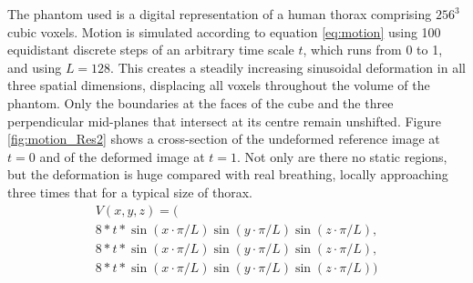 The phantom used is a digital representation\cite{xcatweb} of a human thorax comprising $256^3$ cubic voxels.  Motion is simulated according to equation \ref{eq:motion} using 100 equidistant discrete steps of an arbitrary time scale $t$, which runs from 0 to 1, and using $L=128$.  This creates a steadily increasing sinusoidal deformation in all three spatial dimensions, displacing all voxels throughout the volume of the phantom.  Only the boundaries at the faces of the cube and the three perpendicular mid-planes that intersect at its centre remain unshifted.  Figure \ref{fig:motion_Res2} shows a cross-section of the undeformed reference image at $t=0$ and of the deformed image at $t=1$.  Not only are there no static regions, but the deformation is huge compared with real breathing\cite{Liu2007531}, locally approaching three times that for a typical size of thorax.
\begin{eqnarray}
V(x,y,z) = \bigl(\nonumber\\
8*t*\sin(x \cdot \pi/L)\sin(y \cdot \pi/L)\sin(z \cdot \pi/L),\nonumber \\
8*t*\sin(x \cdot \pi/L)\sin(y \cdot \pi/L)\sin(z \cdot \pi/L),\nonumber\\
8*t*\sin(x \cdot \pi/L)\sin(y \cdot \pi/L)\sin(z \cdot \pi/L)\bigr)
\label{eq:motion}
\end{eqnarray}




